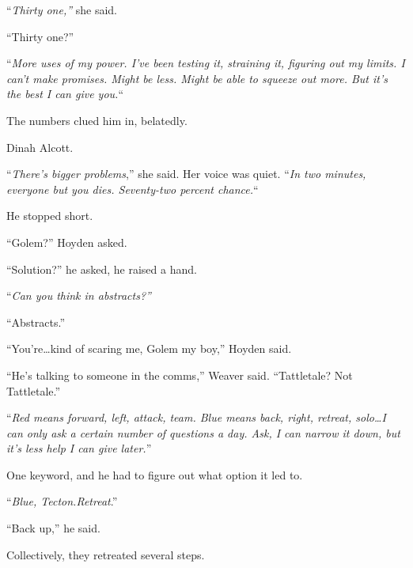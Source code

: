 ``\emph{Thirty one,'' }she said.



``Thirty one?''



``\emph{More uses of my power.  I've been testing it, straining it, figuring out my limits.  I can't make promises.  Might be less.  Might be able to squeeze out more.  But it's the best I can give you.}``



The numbers clued him in, belatedly.



Dinah Alcott.



``\emph{There's bigger problems},'' she said.  Her voice was quiet.  ``\emph{In two minutes, everyone but you dies.  Seventy-two percent chance.}``



He stopped short.



``Golem?''  Hoyden asked.



``Solution?'' he asked, he raised a hand.



``\emph{Can you think in abstracts?''}



``Abstracts.''



``You're\ldots kind of scaring me, Golem my boy,'' Hoyden said.



``He's talking to someone in the comms,'' Weaver said.  ``Tattletale?  Not Tattletale.''



``\emph{Red means forward, left, attack, team.  Blue means back, right, retreat, solo\ldots I can only ask a certain number of questions a day.  Ask, I can narrow it down, but it's less help I can give later.}''



One keyword, and he had to figure out what option it led to.



``\emph{Blue, Tecton.}\emph{Retreat}.''



``Back up,'' he said.



Collectively, they retreated several steps.



